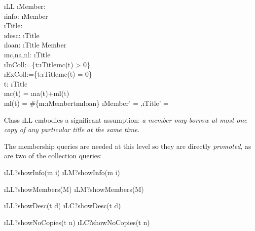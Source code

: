 \documentclass[12pt,a4paper]{article}
\begin{document}
\begin{showspecs}
	\begin{spec}[\equiv]{\i{LL}}
		\i{Member}: \;\\
		\i{info}: \i{Member} \tfun {}\\[0.5ex]
		\i{Title}: \;\\
		\i{desc}: \i{Title} \tfun {}\\[0.5ex]
		\i{loan}: \i{Title \prel Member}\\
		\i{nc,na,nl}: \i{Title} \tfun {}\\[0.5ex]
		\i{InColl}:=\!\{t\!:\!\i{Title}\bullet\i{nc}(t) > 0\}\\
		\i{ExColl}\!:=\!\{t\!:\!\i{Title}\bullet\i{nc}(t) = 0\}\\[0.5ex]
		\forall t: \i{Title}\, \bullet \\
        \hspace{0.5cm}\i{nc}(t) = \i{na}(t)+\i{nl}(t) \,\wedge\\
		\hspace{0.5cm}\i{nl}(t) = \#\{m:\i{Member}\bullet t\mapsto m\in \i{loan}\}
	\post	\i{Member'} = \emptyset \sep \i{Title'} = \emptyset
	\end{spec}
\end{showspecs}

\medskip\noindent Class \i{LL} embodies a significant assumption:
\emph{a member may borrow at most one copy of any particular title at the same time}.

\bigskip\noindent The membership queries are needed at this level so they are
directly \emph{promoted}, as are two of the collection queries:
\begin{showspecs}
	\begin{spec}{\i{LL?showInfo(m \to i)}}
		\i{LM?showInfo(m \to i)}
	\end{spec}
\showbeside
	\begin{spec}{\i{LL?showMembers(\to M)}}
		\i{LM?showMembers(\to M)}
	\end{spec}
\end{showspecs}\smallskip
\begin{showspecs}
	\begin{spec}{\i{LL?showDesc(t \to d)}}
		\i{LC?showDesc(t \to d)}
	\end{spec}
\showbeside
	\begin{spec}{\i{LL?showNoCopies(t \to n)}}
		\i{LC?showNoCopies(t \to n)}
	\end{spec}
\end{showspecs}\noindent
\end{document}
